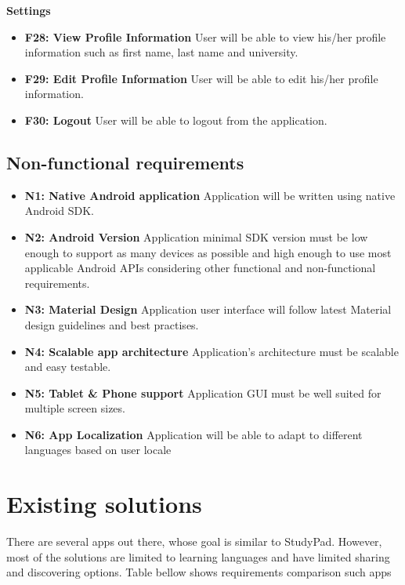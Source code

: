 \documentclass[thesis=B,english]{FITthesis}[2012/10/20]
\newcommand{\appname}{StudyPad}
\begin{document}
\bigskip
\textbf{Settings}
\begin{itemize}
	\item \textbf{F28: View Profile Information} User will be able to view his/her profile information such as first name, last name and  university.
	\item \textbf{F29: Edit Profile Information} User will be able to edit his/her profile information.
	\item \textbf{F30: Logout} User will be able to logout from the application.
\end{itemize}


\subsection{Non-functional requirements}

\begin{itemize}
  \item \textbf{N1: Native Android application}  Application will be written using native Android SDK.
  \item \textbf{N2: Android Version} Application minimal SDK version must be low enough to support as many devices as possible and high enough to use most applicable  Android APIs considering other functional and non-functional requirements.
  \item \textbf{N3: Material Design} Application user interface will follow latest Material design guidelines and best practises.
  \item \textbf{N4: Scalable app architecture} Application's architecture must be scalable and easy testable.
  \item \textbf{N5: Tablet \& Phone support} Application GUI must be well suited for multiple screen sizes.
  \item \textbf{N6: App Localization} Application will be able to adapt to different languages based on user locale
\end{itemize}


\newpage

\section{Existing solutions}

There are several apps out there, whose goal is similar to \appname. However, most of the solutions are limited to learning languages and have limited sharing and discovering options. Table bellow shows requirements comparison such apps
\end{document}
